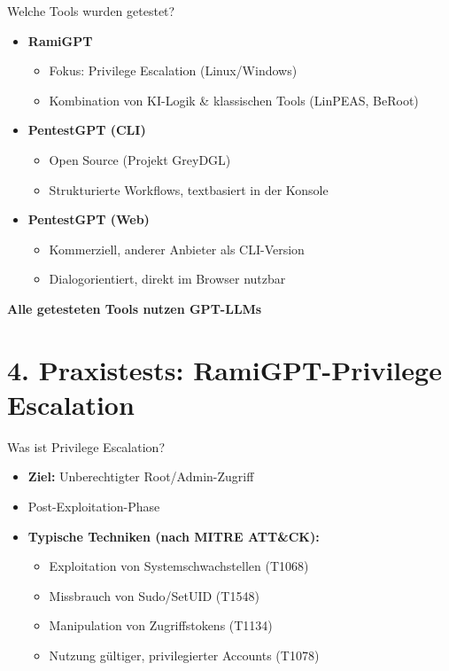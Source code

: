 \documentclass[
	aspectratio=169,	%
	onlytextwidth,		%
	t,					%
	]{beamer}
\begin{document}
\begin{frame}{Welche Tools wurden getestet?}
	
	\begin{itemize}
		\item \textbf{RamiGPT}
		\begin{itemize}
			\item Fokus: Privilege Escalation (Linux/Windows)
			\item Kombination von KI-Logik \& klassischen Tools (LinPEAS, BeRoot)
		\end{itemize}
		
		\item \textbf{PentestGPT (CLI)}
		\begin{itemize}
			\item Open Source (Projekt GreyDGL)
			\item Strukturierte Workflows, textbasiert in der Konsole
		\end{itemize}
		
		\item \textbf{PentestGPT (Web)}
		\begin{itemize}
			\item Kommerziell, anderer Anbieter als CLI-Version
			\item Dialogorientiert, direkt im Browser nutzbar
		\end{itemize}
	\end{itemize}
	\textbf{Alle getesteten Tools nutzen GPT-LLMs}
	
\end{frame}



\section{4. Praxistests: RamiGPT-Privilege Escalation}
\begin{frame}{Was ist Privilege Escalation?}
	\begin{itemize}
		\item \textbf{Ziel:} Unberechtigter Root/Admin-Zugriff
		\item Post-Exploitation-Phase
		\item \textbf{Typische Techniken (nach MITRE ATT\&CK):}
		\begin{itemize}
			\item Exploitation von Systemschwachstellen (T1068)
			\item Missbrauch von Sudo/SetUID (T1548)
			\item Manipulation von Zugriffstokens (T1134)
			\item Nutzung gültiger, privilegierter Accounts (T1078)
		\end{itemize}
	\end{itemize}
\end{frame}
\end{document}
